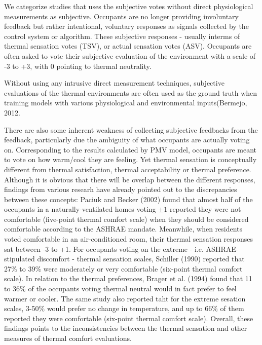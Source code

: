 
We categorize studies that uses the subjective votes without direct physiological measurements as subjective. Occupants are no longer providing involuntary feedback but rather intentional, voluntary responses as signals collected by the control system or algorithm. These subjective responses - usually interms of thermal sensation votes (TSV), or actual sensation votes (ASV). Occupants are often asked to vote their subjective evaluation of the environment with a scale of -3 to +3, with 0 pointing to thermal neutrality. 

Without using any intrusive direct measurement techniques, subjective evaluations of the thermal environments are often used as the ground truth when training models with various physiological and environmental inputs(Bermejo, 2012. 

There are also some inherent weakness of collecting subjective feedbacks from the feedback, particularly due the ambiguity of what occupants are actually voting on. Corresponding to the results calculated by PMV model, occupants are meant to vote on how warm/cool they are feeling. Yet thermal sensation is conceptually different from thermal satisfaction, thermal acceptability or thermal preference\cite{charles_fangers_2003}. Although it is obvious that there will be overlap between the different responses, findings from various researh have already pointed out to the discrepancies between these concepts: Paciuk and Becker (2002) found that almost half of the occupants in a naturally-ventilated homes voting $\pm1$ reported they were not comfortable (five-point thermal comfort scale) when they should be considered comfortable according to the ASHRAE mandate. Meanwhile, when residents voted comfortable in an air-conditioned room, their thermal sensation responses sat between -3 to +1. For occupants voting on the extreme - i.e. ASHRAE-stipulated discomfort - thermal sensation scales, Schiller (1990) reported that 27\% to 39\% were moderately or very comfortable (six-point thermal comfort scale). In relation to the thermal preferences, Brager et al. (1994) found that 11 to 36\% of the occupants voting thermal neutral would in fact prefer to feel warmer or cooler. The same study also reported taht for the extreme sesation scales, 3-50\% would prefer no change in temperature, and up to 66\% of them reported they were comfortable (six-point thermal comfort scale). Overall, these findings points to the inconsistencies between the thermal sensation and other measures of thermal comfort evaluations.

